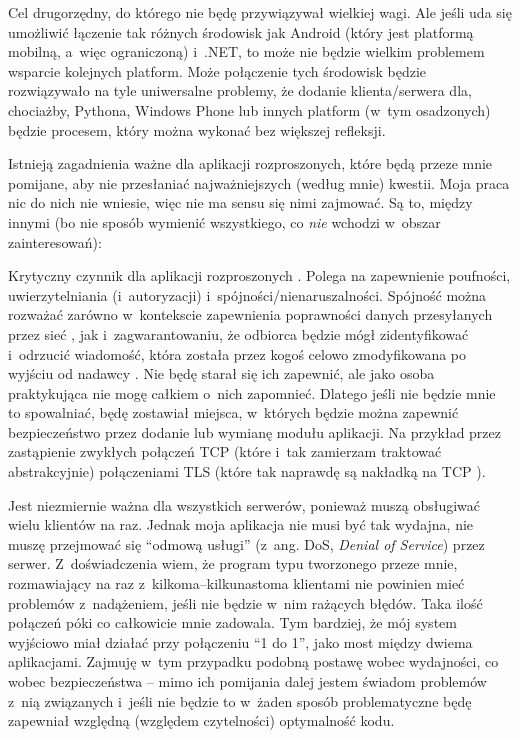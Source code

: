 \begin{description}
Cel drugorzędny, do którego nie będę przywiązywał wielkiej wagi. Ale jeśli uda się umożliwić łączenie tak różnych środowisk jak Android (który jest platformą mobilną, a~więc ograniczoną) i~.NET, to może nie będzie wielkim problemem wsparcie kolejnych platform. Może połączenie tych środowisk będzie rozwiązywało na tyle uniwersalne problemy, że dodanie klienta/serwera dla, chociażby, Pythona, Windows Phone lub innych platform (w~tym osadzonych) będzie procesem, który można wykonać bez większej refleksji. 
\end{description}

Istnieją zagadnienia ważne dla aplikacji rozproszonych, które będą przeze mnie pomijane, aby nie przesłaniać najważniejszych (według mnie) kwestii. Moja praca nic do nich nie wniesie, więc nie ma sensu się nimi zajmować. Są to, między innymi (bo nie sposób wymienić wszystkiego, co \emph{nie} wchodzi w~obszar zainteresowań):

\begin{description}
Krytyczny czynnik dla aplikacji rozproszonych \cite[str.~21]{webservices}. Polega na zapewnienie poufności, uwierzytelniania (i~autoryzacji) i~spójności/nienaruszalności. Spójność można rozważać zarówno w~kontekscie zapewnienia poprawności danych przesyłanych przez sieć \cite{dataintegrity}, jak i~zagwarantowaniu, że odbiorca będzie mógł zidentyfikować i~odrzucić wiadomość, która została przez kogoś celowo zmodyfikowana po wyjściu od nadawcy \cite{datasignature}. Nie będę starał się ich zapewnić, ale jako osoba praktykująca nie mogę całkiem o~nich zapomnieć. Dlatego jeśli nie będzie mnie to spowalniać, będę zostawiał miejsca, w~których będzie można zapewnić bezpieczeństwo przez dodanie lub wymianę modułu aplikacji. Na przykład przez zastąpienie zwykłych połączeń TCP (które i~tak zamierzam traktować abstrakcyjnie) połączeniami TLS (które tak naprawdę są nakładką na TCP \cite[str.~47]{tls}).

Jest niezmiernie ważna dla wszystkich serwerów, ponieważ muszą obsługiwać wielu klientów na raz. Jednak moja aplikacja nie musi być tak wydajna, nie muszę przejmować się ``odmową usługi'' \cite{dos}(z~ang. DoS, \emph{Denial of Service}) przez serwer. Z~doświadczenia wiem, że program typu tworzonego przeze mnie, rozmawiający na raz z~kilkoma--kilkunastoma klientami nie powinien mieć problemów z~nadążeniem, jeśli nie będzie w~nim rażących błędów. Taka ilość połączeń póki co całkowicie mnie zadowala. Tym bardziej, że mój system wyjściowo miał działać przy połączeniu ``1 do 1'', jako most między dwiema aplikacjami. Zajmuję w~tym przypadku podobną postawę wobec wydajności, co wobec bezpieczeństwa -- mimo ich pomijania dalej jestem świadom problemów z~nią związanych i~jeśli nie będzie to w~żaden sposób problematyczne będę zapewniał względną (względem czytelności) optymalność kodu.
\end{description}

